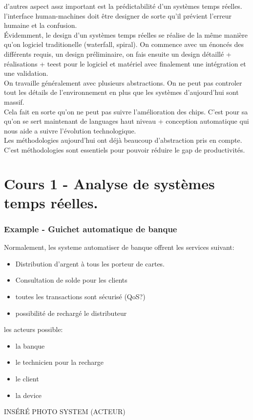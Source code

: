 \documentclass[oneside]{book}
\begin{document}
    d'autres aspect assz important est la prédictabilité d'un systèmes temps réelles. l'interface human-machines doit être designer de sorte qu'il prévient l'erreur humaine et la confusion.\\
    
    Évidemment, le design d'un systèmes temps réelles se réalise de la même manière qu'on logiciel traditionelle (waterfall, spiral). On commence avec un énoncés des différents requis, un design préliminaire, on fais ensuite un design détaillé + réalisations + teest pour le logiciel et matériel avec finalement une intégration et une validation.\\
    
    On travaille généralement avec plusieurs abstractions. On ne peut pas controler tout les détails de l'environnement en plus que les systèmes d'aujourd'hui sont massif.\\
    
    Cela fait en sorte qu'on ne peut pas suivre l'amélioration des chips. C'est pour sa qu'on se sert maintenant de languages haut niveau + conception automatique qui nous aide a suivre l'évolution technologique.\\
    
    Les méthodologies aujourd'hui ont déjà beaucoup d'abstraction pris en compte. C'est méthodologies sont essentiels pour pouvoir réduire le gap de productivités.\\
    
     
    \chapter{Cours 1 - Analyse de systèmes temps réelles.}
    \subsection{Example - Guichet automatique de banque}
    Normalement, les systeme automatiser de banque offrent les services suivant:
    \begin{itemize}
        \item Distribution d'argent à tous les porteur de cartes.
        \item Consultation de solde pour les clients
        \item toutes les transactions sont sécurisé (QoS?)
        \item possibilité de rechargé le distributeur
    \end{itemize}
    les acteurs possible:
    \begin{itemize}
        \item la banque
        \item le technicien pour la recharge
        \item le client
        \item la device
    \end{itemize}
    INSÉRÉ PHOTO SYSTEM (ACTEUR)\\
    
\end{document}
